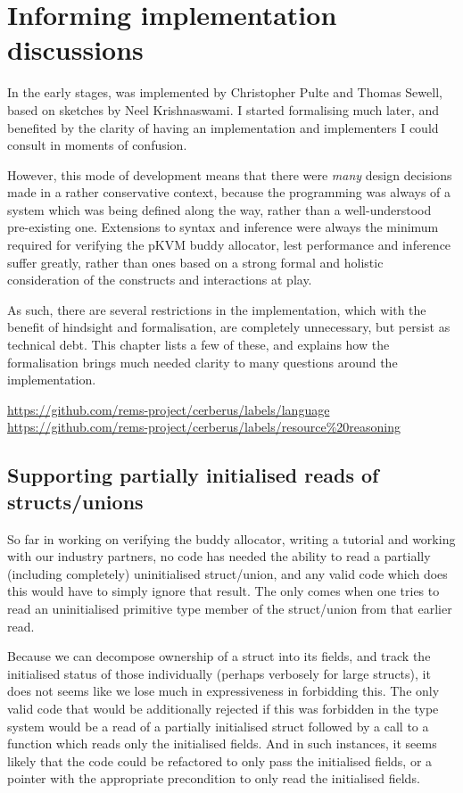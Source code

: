 \chapter{Informing implementation discussions}\label{chap:inform-impl}

In the early stages,  was implemented by Christopher Pulte and Thomas
Sewell, based on sketches by Neel Krishnaswami. I started formalising
 much later, and benefited by the clarity of having an
implementation and implementers I could consult in moments of
confusion.

However, this mode of development means that there were \emph{many} design
decisions made in a rather conservative context, because the programming was
always of a system which was being defined along the way, rather than a
well-understood pre-existing one. Extensions to syntax and inference were
always the minimum required for verifying the pKVM buddy allocator, lest
performance and inference suffer greatly, rather than ones based on a strong
formal and holistic consideration of the constructs and interactions at play.

As such, there are several restrictions in the implementation, which with the
benefit of hindsight and formalisation, are completely unnecessary, but persist
as technical debt. This chapter lists a few of these, and explains how the
formalisation brings much needed clarity to many questions around the
implementation.

\url{https://github.com/rems-project/cerberus/labels/language}
\url{https://github.com/rems-project/cerberus/labels/resource\%20reasoning}

\section{Supporting partially initialised reads of structs/unions}\label{sec:partial-init-structs}

So far in working on verifying the buddy allocator, writing a tutorial and
working with our industry partners, no code has needed the ability to read a
partially (including completely) uninitialised struct/union, and any valid code
which does this would have to simply ignore that result. The  only comes
when one tries to read an uninitialised primitive type member of the
struct/union from that earlier read.

Because we can decompose ownership of a struct into its fields, and track the
initialised status of those individually (perhaps verbosely for large structs),
it does not seems like we lose much in expressiveness in forbidding this. The
only valid code that would be additionally rejected if this was forbidden in
the type system would be a read of a partially initialised struct followed by a
call to a function which reads only the initialised fields. And in such
instances, it seems likely that the code could be refactored to only pass the
initialised fields, or a pointer with the appropriate precondition to only read
the initialised fields.

